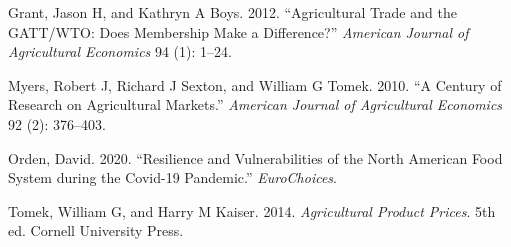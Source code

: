 \documentclass[
]{book}
\begin{document}
\leavevmode\hypertarget{ref-grant2012}{}%
Grant, Jason H, and Kathryn A Boys. 2012. ``Agricultural Trade and the GATT/WTO: Does Membership Make a Difference?'' \emph{American Journal of Agricultural Economics} 94 (1): 1--24.

\leavevmode\hypertarget{ref-myers2010}{}%
Myers, Robert J, Richard J Sexton, and William G Tomek. 2010. ``A Century of Research on Agricultural Markets.'' \emph{American Journal of Agricultural Economics} 92 (2): 376--403.

\leavevmode\hypertarget{ref-orden2020}{}%
Orden, David. 2020. ``Resilience and Vulnerabilities of the North American Food System during the Covid-19 Pandemic.'' \emph{EuroChoices}.

\leavevmode\hypertarget{ref-tomek2014}{}%
Tomek, William G, and Harry M Kaiser. 2014. \emph{Agricultural Product Prices}. 5th ed. Cornell University Press.
\end{document}

